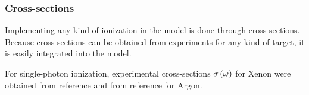%
%
%



\subsubsection{Cross-sections}
\label{section:intro:md:cross-sections}

Implementing any kind of ionization in the model is done through cross-sections.
Because cross-sections can be obtained from experiments for any kind of target,
it is easily integrated into the model.



For single-photon ionization, experimental cross-sections $\sigma\left( \omega \right)$
for Xenon were obtained from reference \cite{West1978} and from
reference \cite{Marr1976} for Argon.

